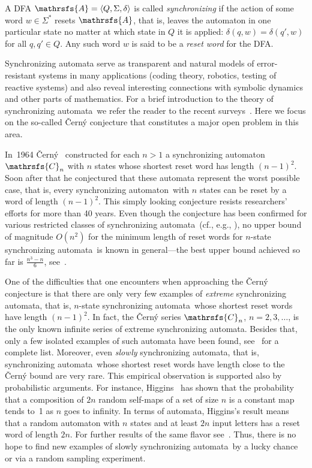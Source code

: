 \documentclass[11pt]{llncs}
\newcommand{\sa}{synchronizing automata}
\newcommand{\san}{synchronizing automaton}
\begin{document}
A DFA $\mathrsfs{A}=\langle Q,\Sigma,\delta\rangle$ is called
\emph{synchronizing} if the action of some word $w\in\Sigma^*$
resets $\mathrsfs{A}$, that is, leaves the automaton in one
particular state no matter at which state in $Q$ it is applied:
$\delta(q,w)=\delta(q',w)$ for all $q,q'\in Q$. Any such word $w$
is said to be a \emph{reset word} for the DFA.

Synchronizing automata serve as transparent and natural models of
error-resistant systems in many applications (coding theory, robotics,
testing of reactive systems) and also reveal interesting connections
with symbolic dynamics and other parts of mathematics. For a brief
introduction to the theory of \sa\ we refer the reader to the recent
surveys~\cite{Sa05,Vo08}. Here we focus on the so-called \v{C}ern\'{y}
conjecture that constitutes a major open problem in this area.

In~1964 \v{C}ern\'{y}~\cite{Ce64} constructed for each $n>1$ a \san\
$\mathrsfs{C}_n$ with $n$ states whose shortest reset word has length
$(n-1)^2$. Soon after that he conjectured that these automata
represent the worst possible case, that is, every \san\ with $n$ states
can be reset by a word of length $(n-1)^2$. This simply looking conjecture
resists researchers' efforts for more than 40 years. Even though the
conjecture has been confirmed for various restricted classes of \sa\
(cf., e.g., \cite{Ep90,Du98,Ka03,Tr07,AS09,Vo09}), no upper bound of magnitude
$O(n^2)$ for the minimum length of reset words for $n$-state \sa\ is known
in general---the best upper bound achieved so far is $\frac{n^3-n}6$,
see~\cite{Pi83}.

One of the difficulties that one encounters when approaching the
\v{C}ern\'{y} conjecture is that there are only very few examples
of \emph{extreme} \sa, that is, $n$-state \sa\ whose shortest reset
words have length $(n-1)^2$. In fact, the \v{C}ern\'{y} series
$\mathrsfs{C}_n$, $n=2,3,\dotsc$, is the only known infinite series
of extreme \sa. Besides that, only a few isolated examples
of such automata have been found, see~\cite{Vo08} for a complete list.
Moreover, even \emph{slowly} \sa, that is, \sa\ whose shortest reset words
have length close to the \v{C}ern\'{y} bound are very rare. This empirical
observation is supported also by probabilistic arguments. For instance,
Higgins~\cite{Hi88} has shown that the probability that a composition of $2n$
random self-maps of a set of size $n$ is a constant map tends to~1 as $n$
goes to infinity. In terms of automata, Higgins's result means that
a random automaton with $n$ states and at least $2n$ input letters
has a reset word of length $2n$. For further results of the same flavor
see~\cite{SZ}. Thus, there is no hope to find new examples of slowly
\sa\ by a lucky chance or via a random sampling experiment.
\end{document}
